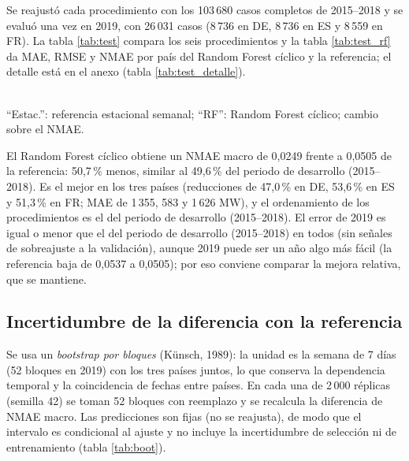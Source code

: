 Se reajustó cada procedimiento con los 103\,680 casos completos de 2015--2018 y se evaluó una vez en 2019, con 26\,031 casos (8\,736 en DE, 8\,736 en ES y 8\,559 en FR). La tabla \ref{tab:test} compara los seis procedimientos y la tabla \ref{tab:test_rf} da MAE, RMSE y NMAE por país del Random Forest cíclico y la referencia; el detalle está en el anexo (tabla \ref{tab:test_detalle}).

\begin{table}[!htbp]
    \centering
        \caption{NMAE por país y macro en la reserva 2019 (adimensional) y NMAE macro del periodo de desarrollo (2015--2018; M3$^\ast$: promedio de W1--W3 de S1). Las cifras de 2019 no se usaron para elegir nada.\label{tab:test}}
        \footnotesize
        \resizebox{\textwidth}{!}{}
\end{table}

\begin{table}[!htbp]
    \centering
        \caption{Random Forest cíclico frente a la referencia estacional semanal en la reserva 2019: MAE y RMSE en MW, NMAE y denominadores ($n$).\label{tab:test_rf}}
        \small
        
    \\ ``Estac.'': referencia estacional semanal; ``RF'': Random Forest cíclico; cambio sobre el NMAE.
\end{table}

El Random Forest cíclico obtiene un NMAE macro de 0,0249 frente a 0,0505 de la referencia: 50,7\,\% menos, similar al 49,6\,\% del periodo de desarrollo (2015--2018). Es el mejor en los tres países (reducciones de 47,0\,\% en DE, 53,6\,\% en ES y 51,3\,\% en FR; MAE de 1\,355, 583 y 1\,626 MW), y el ordenamiento de los procedimientos es el del periodo de desarrollo (2015--2018). El error de 2019 es igual o menor que el del periodo de desarrollo (2015--2018) en todos (sin señales de sobreajuste a la validación), aunque 2019 puede ser un año algo más fácil (la referencia baja de 0,0537 a 0,0505); por eso conviene comparar la mejora relativa, que se mantiene.

\subsection{Incertidumbre de la diferencia con la referencia} \label{sec:boot}

Se usa un \textit{bootstrap por bloques} (Künsch, 1989): la unidad es la semana de 7 días (52 bloques en 2019) con los tres países juntos, lo que conserva la dependencia temporal y la coincidencia de fechas entre países. En cada una de 2\,000 réplicas (semilla 42) se toman 52 bloques con reemplazo y se recalcula la diferencia de NMAE macro. Las predicciones son fijas (no se reajusta), de modo que el intervalo es condicional al ajuste y no incluye la incertidumbre de selección ni de entrenamiento (tabla \ref{tab:boot}).

